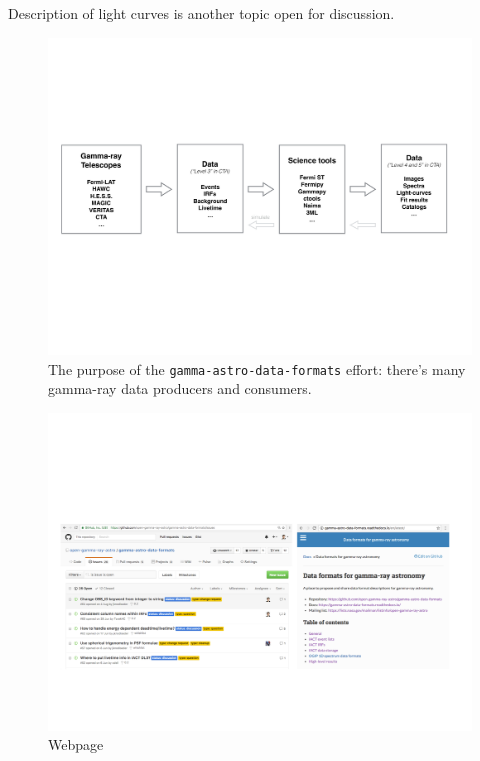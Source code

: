 Description of light curves is another topic open for discussion. 

\begin{figure}[tb]
  \centerline{\includegraphics[width=\textwidth]{figures/purpose}}
  \caption{The purpose of the \texttt{gamma-astro-data-formats} effort: there's
  many gamma-ray data producers and consumers.}
\end{figure}

\begin{figure}[tb]
  \centerline{\includegraphics[width=\textwidth]{figures/webpage}}
  \caption{Webpage}
\end{figure}

